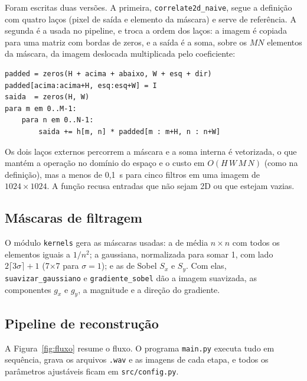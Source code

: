 Foram escritas duas versões. A primeira, \texttt{correlate2d\_naive}, segue a definição com quatro laços (pixel de saída e elemento da máscara) e serve de referência. A segunda é a usada no pipeline, e troca a ordem dos laços: a imagem é copiada para uma matriz com bordas de zeros, e a saída é a soma, sobre os $M N$ elementos da máscara, da imagem deslocada multiplicada pelo coeficiente:
\begin{center}
\begin{minipage}{0.8\textwidth}
\small
\begin{verbatim}
padded = zeros(H + acima + abaixo, W + esq + dir)
padded[acima:acima+H, esq:esq+W] = I
saida  = zeros(H, W)
para m em 0..M-1:
    para n em 0..N-1:
        saida += h[m, n] * padded[m : m+H, n : n+W]
\end{verbatim}
\end{minipage}
\end{center}
Os dois laços externos percorrem a máscara e a soma interna é vetorizada, o que mantém a operação no domínio do espaço e o custo em $O(H\,W\,M\,N)$ (como na definição), mas a menos de 0,1~s para cinco filtros em uma imagem de $1024\times 1024$. A função recusa entradas que não sejam 2D ou que estejam vazias.

\subsection{Máscaras de filtragem}

O módulo \texttt{kernels} gera as máscaras usadas: a de média $n\times n$ com todos os elementos iguais a $1/n^2$; a gaussiana, normalizada para somar 1, com lado $2\lceil 3\sigma\rceil+1$ (7$\times$7 para $\sigma=1$); e as de Sobel $S_x$ e $S_y$. Com elas, \texttt{suavizar\_gaussiano} e \texttt{gradiente\_sobel} dão a imagem suavizada, as componentes $g_x$ e $g_y$, a magnitude e a direção do gradiente.

\subsection{Pipeline de reconstrução}

A Figura~\ref{fig:fluxo} resume o fluxo. O programa \texttt{main.py} executa tudo em sequência, grava os arquivos \texttt{.wav} e as imagens de cada etapa, e todos os parâmetros ajustáveis ficam em \texttt{src/config.py}.

